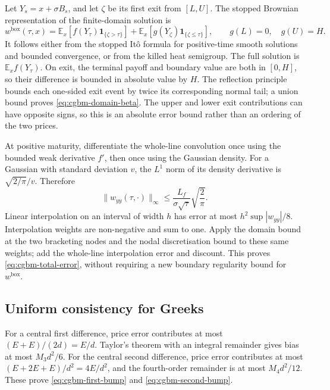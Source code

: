\documentclass[11pt]{article}
\begin{document}
Let $Y_s=x+\sigma B_s$, and let $\zeta$ be its first exit from $[L,U]$.
The stopped Brownian representation of the finite-domain solution is
\begin{equation}
 w^{\mathrm{box}}(\tau,x)=
 \mathbb E_x[f(Y_\tau)\mathbf 1_{\{\zeta>\tau\}}]
 +\mathbb E_x[g(Y_\zeta)\mathbf 1_{\{\zeta\leq\tau\}}],
 \qquad g(L)=0,\quad g(U)=H.
 \label{eq:cgbm-stopped-heat}
\end{equation}
It follows either from the stopped It\^o formula for positive-time smooth
solutions and bounded convergence, or from the killed heat semigroup.
The full solution is $\mathbb E_x f(Y_\tau)$. On exit, the terminal payoff
and boundary value are both in $[0,H]$, so their difference is bounded
in absolute value by $H$. The reflection principle bounds each one-sided
exit event by twice its corresponding normal tail; a union bound proves
\eqref{eq:cgbm-domain-beta}. The upper and lower exit contributions can
have opposite signs, so this is an absolute error bound rather than an
ordering of the two prices.

At positive maturity, differentiate the whole-line convolution once using
the bounded weak derivative $f'$, then once using the Gaussian density.
For a Gaussian with standard deviation $v$, the $L^1$ norm of its density
derivative is $\sqrt{2/\pi}/v$. Therefore
\begin{equation}
 \|w_{yy}(\tau,\cdot)\|_\infty
 \leq \frac{L_f}{\sigma\sqrt{\tau}}\sqrt{\frac{2}{\pi}}.
 \label{eq:cgbm-heat-curvature}
\end{equation}
Linear interpolation on an interval of width $h$ has error at most
$h^2\sup|w_{yy}|/8$. Interpolation weights are non-negative and sum to
one. Apply the domain bound at the two bracketing nodes and the nodal
discretisation bound to these same weights; add the whole-line
interpolation error and discount. This proves
\eqref{eq:cgbm-total-error}, without requiring a new boundary regularity
bound for $w^{\mathrm{box}}$.

\subsection{Uniform consistency for Greeks}

For a central first difference, price error contributes at most
$(E+E)/(2d)=E/d$. Taylor's theorem with an integral remainder gives
bias at most $M_3d^2/6$. For the central second difference, price error
contributes at most $(E+2E+E)/d^2=4E/d^2$, and the fourth-order remainder
is at most $M_4d^2/12$. These prove
\eqref{eq:cgbm-first-bump} and \eqref{eq:cgbm-second-bump}.
\end{document}
